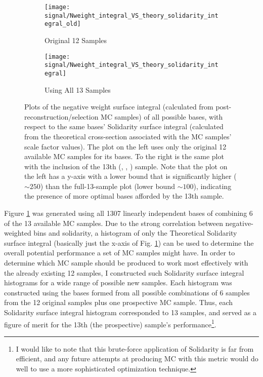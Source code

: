     \begin{figure}[tbh]
        \begin{subfigure}{0.5\textwidth}
            \texttt{[image: signal/Nweight\_integral\_VS\_theory\_solidarity\_integral\_old]}
            \captionsetup{justification=centering} \caption{Original 12 Samples}
        \end{subfigure}
        \begin{subfigure}{0.5\textwidth}
            \texttt{[image: signal/Nweight\_integral\_VS\_theory\_solidarity\_integral]}
            \captionsetup{justification=centering} \caption{Using All 13 Samples}
        \end{subfigure}
        \caption{
            Plots of the negative weight surface integral (calculated from post-reconstruction/selection MC samples)
                of all possible bases, with respect to the same bases' Solidarity surface integral
                (calculated from the theoretical cross-section associated with the MC samples' scale factor values).
            The plot on the left uses only the original 12 available MC samples for its bases.
            To the right is the same plot with the inclusion of the 13th (, , ) sample.
            Note that the plot on the left has a y-axis with a lower bound that is significantly higher ($\sim 250$) 
                than the full-13-sample plot (lower bound $\sim 100$),
                indicating the presence of more optimal bases afforded by the 13th sample.
        }
        \label{fig:nWeight_solidarity_scatter}
    \end{figure}


    Figure \ref{fig:nWeight_solidarity_scatter} was generated using all 1307 linearly independent bases of combining 6 of the 13 available MC samples.
    Due to the strong correlation between negative-weighted bins and solidarity,
        a histogram of only the Theoretical Solidarity surface integral
        (basically just the x-axis of Fig. \ref{fig:nWeight_solidarity_scatter})
        can be used to determine the overall potential performance a set of MC samples might have.
    In order to determine which MC sample should be produced to work most effectively with the already existing 12 samples,
        I constructed such Solidarity surface integral histograms for a wide range of possible new samples.
    Each histogram was constructed using the bases formed from all possible combinations of 6 samples from
        the 12 original samples plus one prospective MC sample.
    Thus, each Solidarity surface integral histogram corresponded to 13 samples,
        and served as a figure of merit for the 13th (the prospective) sample's performance\footnote{
            I would like to note that this brute-force application of Solidarity is far from efficient,
                and any future attempts at producing MC with this metric
                would do well to use a more sophisticated optimization technique.
        }.

